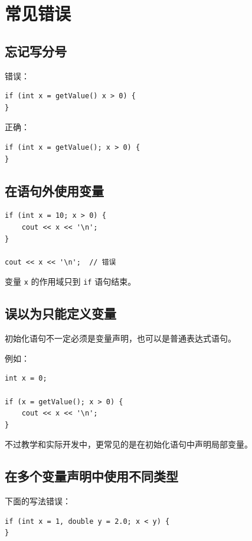 \documentclass[UTF8,12pt,a4paper]{ctexart}
\begin{document}
\section{常见错误}

\subsection{忘记写分号}

错误：

\begin{lstlisting}
if (int x = getValue() x > 0) {
}
\end{lstlisting}

正确：

\begin{lstlisting}
if (int x = getValue(); x > 0) {
}
\end{lstlisting}

\subsection{在语句外使用变量}

\begin{lstlisting}
if (int x = 10; x > 0) {
    cout << x << '\n';
}

cout << x << '\n';  // 错误
\end{lstlisting}

变量 \texttt{x} 的作用域只到 \texttt{if} 语句结束。

\subsection{误以为只能定义变量}

初始化语句不一定必须是变量声明，也可以是普通表达式语句。

例如：

\begin{lstlisting}
int x = 0;

if (x = getValue(); x > 0) {
    cout << x << '\n';
}
\end{lstlisting}

不过教学和实际开发中，更常见的是在初始化语句中声明局部变量。

\subsection{在多个变量声明中使用不同类型}

下面的写法错误：

\begin{lstlisting}
if (int x = 1, double y = 2.0; x < y) {
}
\end{lstlisting}
\end{document}
